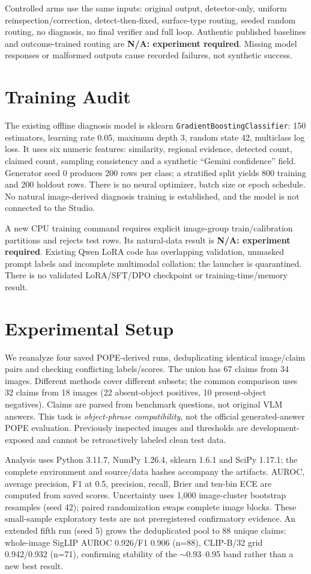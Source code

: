 \documentclass[conference]{IEEEtran}
\newcommand{\missing}{\textbf{N/A: experiment required}}
\begin{document}
Controlled arms use the same inputs: original output, detector-only, uniform
reinspection/correction, detect-then-fixed, surface-type routing, seeded random
routing, no diagnosis, no final verifier and full loop. Authentic published
baselines and outcome-trained routing are \missing. Missing model responses
or malformed outputs cause recorded failures, not synthetic success.

\section{Training Audit}
The existing offline diagnosis model is sklearn
\texttt{GradientBoostingClassifier}: 150 estimators, learning rate 0.05,
maximum depth 3, random state 42, multiclass log loss. It uses six numeric
features: similarity, regional evidence, detected count, claimed count,
sampling consistency and a synthetic ``Gemini confidence'' field. Generator
seed 0 produces 200 rows per class; a stratified split yields 800 training and
200 holdout rows. There is no neural optimizer, batch size or epoch schedule.
No natural image-derived diagnosis training is established, and the model is
not connected to the Studio.

A new CPU training command requires explicit image-group train/calibration
partitions and rejects test rows. Its natural-data result is \missing.
Existing Qwen LoRA code has overlapping validation, unmasked prompt labels
and incomplete multimodal collation; the launcher is quarantined. There is no
validated LoRA/SFT/DPO checkpoint or training-time/memory result.

\section{Experimental Setup}
We reanalyze four saved POPE-derived runs, deduplicating identical image/claim
pairs and checking conflicting labels/scores. The union has 67 claims from 34
images. Different methods cover different subsets; the common comparison uses
32 claims from 18 images (22 absent-object positives, 10 present-object
negatives). Claims are parsed from benchmark questions, not original VLM
answers. This task is \emph{object-phrase compatibility}, not the official
generated-answer POPE evaluation. Previously inspected images and thresholds
are development-exposed and cannot be retroactively labeled clean test data.

Analysis uses Python 3.11.7, NumPy 1.26.4, sklearn 1.6.1 and SciPy 1.17.1;
the complete environment and source/data hashes accompany the artifacts.
AUROC, average precision, F1 at 0.5, precision, recall, Brier and ten-bin ECE
are computed from saved scores. Uncertainty uses 1,000 image-cluster bootstrap
resamples (seed 42); paired randomization swaps complete image blocks. These
small-sample exploratory tests are not preregistered confirmatory evidence. An
extended fifth run (seed 5) grows the deduplicated pool to 88 unique claims:
whole-image SigLIP AUROC 0.926/F1 0.906 (n=88), CLIP-B/32 grid 0.942/0.932
(n=71), confirming stability of the $\sim$0.93--0.95 band rather than a new
best result.
\end{document}
